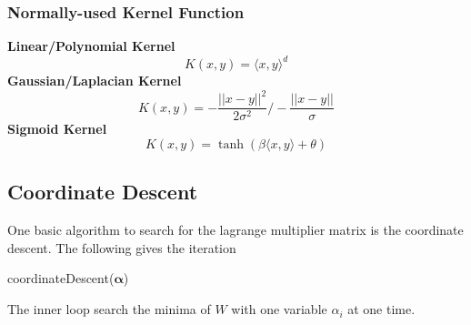 \documentclass[12pt]{article}
\newcommand{\la}{\langle}
\newcommand{\ra}{\rangle}
\begin{document}
\subsubsection{Normally-used Kernel Function}
\noindent \textbf{Linear/Polynomial Kernel} 
\begin{equation}
    K(x, y) = \la x, y \ra^d
\end{equation}
\textbf{Gaussian/Laplacian Kernel}
\begin{equation}
    K(x, y) = -\frac{||x - y||^2}{2\sigma^2} \bigg/ -\frac{||x-y||}{\sigma}
\end{equation}
\textbf{Sigmoid Kernel}
\begin{equation}
    K(x, y) = \tanh \left( \beta \la x, y \ra + \theta\right)
\end{equation}
\subsection{Coordinate Descent}
One basic algorithm to search for the lagrange multiplier matrix is the coordinate descent. The following gives the iteration
\begin{algorithm}[H]
    \caption{coordinateDescent($\bm{\alpha}$)}
    \label{coorDes}
    \begin{algorithmic}
        \ENDFOR
        \ENDWHILE
    \end{algorithmic}
\end{algorithm}
The inner loop search the minima of $W$ with one variable $\alpha_i$ at one time.
\end{document}
